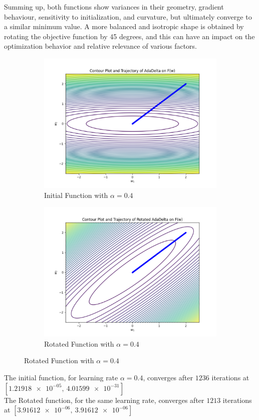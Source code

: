 Summing up, both functions show variances in their geometry, gradient behaviour, sensitivity to initialization, and curvature, but ultimately converge to a similar minimum value. A more balanced and isotropic shape is obtained by rotating the objective function by 45 degrees, and this can have an impact on the optimization behavior and relative relevance of various factors.
\begin{figure}[H]
	\centering
	\begin{subfigure}{0.45\textwidth}
		\includegraphics[width=\textwidth]{../Problem 8/ADADELTA_04.pdf}
		\caption{Initial Function with $\alpha=0.4$}
	\end{subfigure}
	\quad
	\begin{subfigure}{0.45\textwidth}
		\includegraphics[width=\textwidth]{../Problem 8/ROTATED_ADADELTA.pdf}
		\caption{Rotated Function with  $\alpha=0.4$}
	\end{subfigure}
\end{figure}
\vspace{3mm}

The initial function, for learning rate $\alpha=0.4$, converges after $1236$ iterations at $\left[\num{1.21918e-05},\ \num{4.01599e-31}\right]$\\
The Rotated function, for the same learning rate, converges after $1213$ iterations at $\left[\num{3.91612e-06},\ \num{3.91612e-06}\right]$\\
